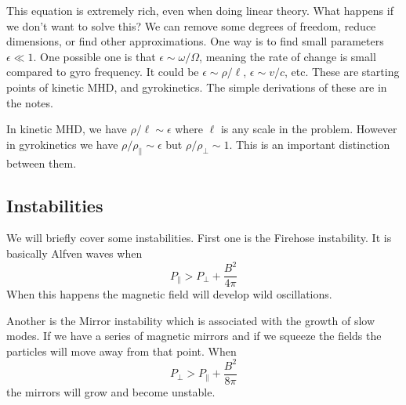 \documentclass[letterpaper, 11pt]{article}
\numberwithin{equation}{section}
\numberwithin{figure}{section}
\begin{document}
This equation is extremely rich, even when doing linear theory. What happens if
we don't want to solve this? We can remove some degrees of freedom, reduce
dimensions, or find other approximations. One way is to find small parameters
$\epsilon \ll 1$. One possible one is that $\epsilon \sim \omega/\Omega$,
meaning the rate of change is small compared to gyro frequency. It could be
$\epsilon \sim \rho/\ell$, $\epsilon \sim v/c$, etc. These are starting points
of kinetic MHD, and gyrokinetics. The simple derivations of these are in the
notes.

In kinetic MHD, we have $\rho/\ell \sim \epsilon$ where $\ell$ is any scale in
the problem. However in gyrokinetics we have $\rho/\rho_{\parallel}\sim
\epsilon$ but $\rho/\rho_{\perp}\sim 1$. This is an important distinction
between them.

\subsection{Instabilities}

We will briefly cover some instabilities. First one is the Firehose instability.
It is basically Alfven waves when
\begin{equation}
  \label{eq:38}
  P_{\parallel} > P_{\perp} + \frac{B^2}{4\pi}
\end{equation}
When this happens the magnetic field will develop wild oscillations.

Another is the Mirror instability which is associated with the growth of slow
modes. If we have a series of magnetic mirrors and if we squeeze the fields the
particles will move away from that point. When
\begin{equation}
  \label{eq:39}
  P_{\perp} > P_{\parallel} + \frac{B^2}{8\pi}
\end{equation}
the mirrors will grow and become unstable.
\end{document}
